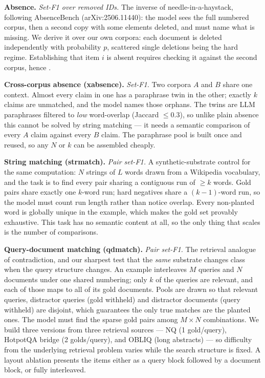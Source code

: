 \textbf{Absence.} \emph{Set-F1 over removed IDs.} The inverse of needle-in-a-haystack, following AbsenceBench (arXiv:2506.11440): the model sees the full numbered corpus, then a second copy with some elements deleted, and must name what is missing. We derive it over our own corpora: each document is deleted independently with probability $p$, scattered single deletions being the hard regime. Establishing that item $i$ is absent requires checking it against the second corpus, hence .

\textbf{Cross-corpus absence (xabsence).} \emph{Set-F1.} Two corpora $A$ and $B$ share one context. Almost every claim in one has a paraphrase twin in the other; exactly $k$ claims are unmatched, and the model names those orphans. The twins are LLM paraphrases filtered to \emph{low} word-overlap (Jaccard $\leq 0.3$), so unlike plain absence this cannot be solved by string matching --- it needs a semantic comparison of every $A$ claim against every $B$ claim. The paraphrase pool is built once and reused, so any $N$ or $k$ can be assembled cheaply.

\textbf{String matching (strmatch).} \emph{Pair set-F1.} A synthetic-substrate control for the same computation: $N$ strings of $L$ words drawn from a Wikipedia vocabulary, and the task is to find every pair sharing a contiguous run of $\geq k$ words. Gold pairs share exactly one $k$-word run; hard negatives share a $(k{-}1)$-word run, so the model must count run length rather than notice overlap. Every non-planted word is globally unique in the example, which makes the gold set provably exhaustive. This task has no semantic content at all, so the only thing that scales is the number of comparisons.

\textbf{Query-document matching (qdmatch).} \emph{Pair set-F1.} The retrieval analogue of contradiction, and our sharpest test that the \emph{same} substrate changes class when the query structure changes. An example interleaves $M$ queries and $N$ documents under one shared numbering; only $k$ of the queries are relevant, and each of those maps to all of its gold documents. Pools are drawn so that relevant queries, distractor queries (gold withheld) and distractor documents (query withheld) are disjoint, which guarantees the only true matches are the planted ones. The model must find the sparse gold pairs among $M \times N$ combinations. We build three versions from three retrieval sources --- NQ (1 gold/query), HotpotQA bridge (2 golds/query), and OBLIQ (long abstracts) --- so difficulty from the underlying retrieval problem varies while the search structure is fixed. A layout ablation presents the items either as a query block followed by a document block, or fully interleaved.

